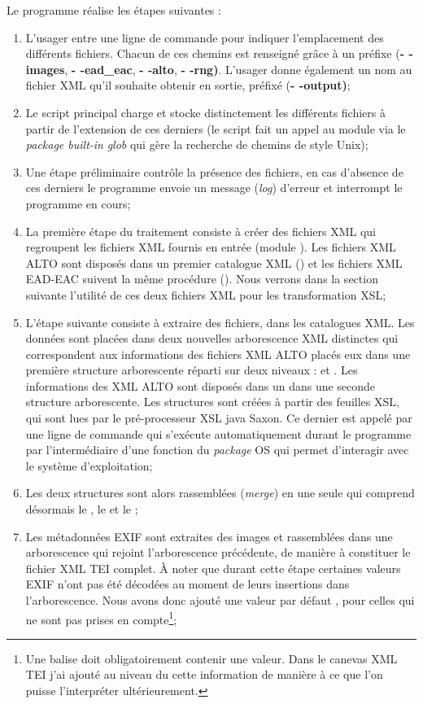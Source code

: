 Le programme réalise les étapes suivantes :
\begin{enumerate}
    \item L'usager entre une ligne de commande pour indiquer l'emplacement des différents fichiers. Chacun de ces chemins est renseigné grâce à un préfixe (\textbf{- -images}, \textbf{- -ead\_eac}, \textbf{- -alto}, \textbf{- -rng)}. L'usager donne également un nom au fichier XML qu'il souhaite obtenir en sortie, préfixé (\textbf{- -output)};
    \item Le script principal charge et stocke distinctement les différents fichiers à partir de l'extension de ces derniers (le script fait un appel au module  via le \textit{package built-in} \textit{glob} qui gère la recherche de chemins de style Unix);
    \item Une étape préliminaire contrôle la présence des fichiers, en cas d'absence de ces derniers le programme envoie un message (\textit{log}) d'erreur et interrompt le programme en cours;
    \item La première étape du traitement consiste à créer des fichiers XML  qui regroupent les fichiers XML fournis en entrée (module ). Les fichiers XML ALTO sont disposés dans un premier catalogue XML () et les fichiers XML EAD-EAC suivent la même procédure (). Nous verrons dans la section suivante l'utilité de ces deux fichiers XML pour les transformation XSL;
    \item L'étape suivante consiste à extraire des fichiers, dans les catalogues XML. Les données sont placées dans deux nouvelles arborescence XML distinctes qui correspondent aux informations des fichiers XML ALTO placés eux dans une première structure arborescente réparti sur deux niveaux :  et . Les informations des XML ALTO sont disposés dans un  dans une seconde structure arborescente. Les structures sont créées à partir des feuilles XSL, qui sont lues par le pré-processeur XSL java Saxon. Ce dernier est appelé par une ligne de commande qui s'exécute automatiquement durant le programme par l'intermédiaire d'une fonction du \textit{package} OS qui permet d'interagir avec le système d'exploitation;
    \item Les deux structures sont alors rassemblées (\textit{merge}) en une seule qui comprend désormais le , le  et le ;
    \item Les métadonnées EXIF sont extraites des images et rassemblées dans une arborescence  qui rejoint l'arborescence précédente, de manière à constituer le fichier XML TEI complet. À noter que durant cette étape certaines valeurs EXIF n'ont pas été décodées au moment de leurs insertions dans l'arborescence. Nous avons donc ajouté une valeur par défaut , pour celles qui ne sont pas prises en compte\footnote{Une balise  doit obligatoirement contenir une valeur. Dans le canevas XML TEI j'ai ajouté au niveau du  cette information de manière à ce que l'on puisse l'interpréter ultérieurement.};

\end{enumerate}
